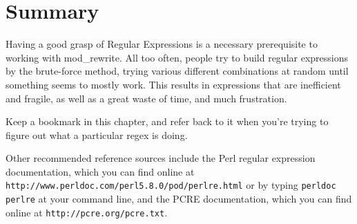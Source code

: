 \section{Summary}

Having a good grasp of Regular Expressions is a necessary prerequisite to working with 
mod\_rewrite. All too often, people try to build regular expressions by the brute-force method, 
trying various different combinations at random until something seems to mostly work. This 
results in expressions that are inefficient and fragile, as well as a great waste of time, and 
much frustration.

Keep a bookmark in this chapter, and refer back to it when you're trying to figure out 
what a particular regex is doing.

Other recommended reference sources include the Perl regular expression documentation, 
which you can find online at \verb=http://www.perldoc.com/perl5.8.0/pod/perlre.html= or by typing 
\verb=perldoc perlre= at your command line, and the PCRE documentation, which you can find online at 
\verb=http://pcre.org/pcre.txt=. 

